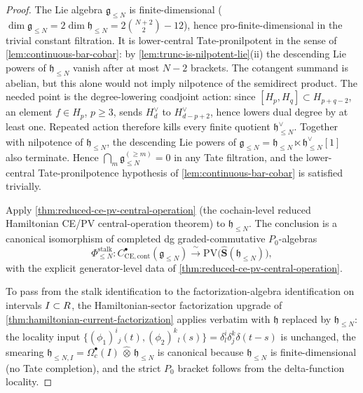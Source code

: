 \begin{proof}
The Lie algebra $\mathfrak g_{\leq N}$ is finite-dimensional
($\dim\mathfrak g_{\leq N}=2\dim\mathfrak h_{\leq N}=
2\binom{N+2}{2}-12$), hence pro-finite-dimensional in the trivial
constant filtration. It is lower-central Tate-pronilpotent in the sense of
\ref{lem:continuous-bar-cobar}: by
\ref{lem:trunc-is-nilpotent-lie}(ii) the descending Lie powers of
$\mathfrak h_{\leq N}$ vanish after at most $N-2$ brackets.  The
cotangent summand is abelian, but this alone would not imply nilpotence
of the semidirect product.  The needed point is the degree-lowering
coadjoint action: since \([H_p,H_q]\subset H_{p+q-2}\), an element
\(f\in H_p\), \(p\geq3\), sends \(H_d^\vee\) to
\(H_{d-p+2}^\vee\), hence lowers dual degree by at least one.  Repeated
action therefore kills every finite quotient
\(\mathfrak h_{\leq N}^\vee\).  Together with nilpotence of
\(\mathfrak h_{\leq N}\), the descending Lie powers of
\(\mathfrak g_{\leq N}=\mathfrak h_{\leq N}\ltimes
\mathfrak h_{\leq N}^\vee[1]\) also terminate. Hence
$\bigcap_m\mathfrak g_{\leq N}^{(\geq m)}=0$ in any Tate
filtration, and the lower-central Tate-pronilpotence hypothesis of
\ref{lem:continuous-bar-cobar} is satisfied trivially.

Apply \ref{thm:reduced-ce-pv-central-operation} (the cochain-level reduced
Hamiltonian CE/PV central-operation theorem) to $\mathfrak h_{\leq N}$.
The conclusion is a canonical isomorphism of completed dg
graded-commutative $P_0$-algebras
$$\Phi_{\leq N}^{\mathrm{stalk}}:
  C^\bullet_{\mathrm{CE},\mathrm{cont}}(\mathfrak g_{\leq N})
  \xrightarrow{\ \sim\ }
  \mathrm{PV}\bigl(\widehat{\mathbf S}(\mathfrak h_{\leq N})\bigr),$$
with the explicit generator-level data of
\ref{thm:reduced-ce-pv-central-operation}.

To pass from the stalk identification to the factorization-algebra
identification on intervals $I\subset R$, the Hamiltonian-sector
factorization upgrade of \ref{thm:hamiltonian-current-factorization}
applies verbatim with $\mathfrak h$ replaced by
$\mathfrak h_{\leq N}$: the locality input
$\{(\phi_1)^i{}_j(t),(\phi_2)^k{}_l(s)\}=\delta^i_l\delta^k_j\delta(t-s)$
is unchanged, the smearing
  $\mathfrak h_{\leq N,I}=\Omega^\bullet_c(I)\,\widehat\otimes\,
  \mathfrak h_{\leq N}$ is canonical because $\mathfrak h_{\leq N}$
is finite-dimensional (no Tate completion), and the strict $P_0$
bracket follows from the delta-function locality.


\end{proof}
